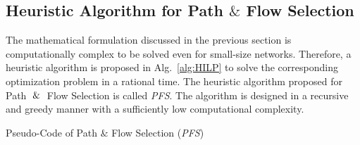 \documentclass[10pt, journal, letterpaper]{IEEEtran}
\begin{document}
\subsection{Heuristic Algorithm for Path $\&$ Flow Selection}\label{subsec:heuristic_alg}
The mathematical formulation discussed in the previous section is computationally complex to be solved even for small-size networks. Therefore, a heuristic algorithm is proposed in Alg.~\ref{alg:HILP} to solve the corresponding optimization problem in a rational time. The heuristic algorithm proposed for Path $\And$ Flow Selection is called \textit{PFS}. The algorithm is designed in a recursive and greedy manner with a sufficiently low computational complexity.

\begin{algorithm}[!htbp]
	\caption{Pseudo-Code of Path $\&$ Flow Selection (\textit{PFS})}
	\label{alg:HILP}
	\small
	\allowdisplaybreaks
	\begin{algorithmic}[1]
        	\EndFor
    	\EndFor\\
	\end{algorithmic}
\end{algorithm}
\end{document}
